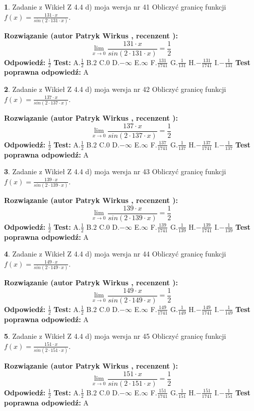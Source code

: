 \documentclass[12pt, a4paper]{article}
\theoremstyle{definition} %
\newtheorem{zad}{}
\newcommand{\zadStart}[1]{\begin{zad}#1\newline}
\newcommand{\zadStop}{\end{zad}}
\newcommand{\rozwStart}[2]{\noindent \textbf{Rozwiązanie (autor #1 , recenzent #2): }\newline}
\newcommand{\rozwStop}{\newline}
\newcommand{\odpStart}{\noindent \textbf{Odpowiedź:}\newline}
\newcommand{\odpStop}{\newline}
\newcommand{\testStart}{\noindent \textbf{Test:}\newline}
\newcommand{\testStop}{\newline}
\newcommand{\kluczStart}{\noindent \textbf{Test poprawna odpowiedź:}\newline}
\newcommand{\kluczStop}{\newline}
\begin{document}
\zadStart{Zadanie z Wikieł Z 4.4 d) moja wersja nr 41}
Obliczyć granicę funkcji $f(x)=\frac{131\cdot x}{sin(2 \cdot131\cdot x)}$.
\zadStop
\rozwStart{Patryk Wirkus}{}
$$\lim\limits_{x\to 0}\frac{131\cdot x}{sin(2 \cdot131\cdot x)}=\frac{1}{2}$$
\rozwStop
\odpStart
$\frac{1}{2}$
\odpStop
\testStart
A.$\frac{1}{2}$
B.$2$
C.$0$
D.$-\infty$
E.$\infty$
F.$\frac{131}{1741}$
G.$\frac{1}{131}$
H.$-\frac{131}{1741}$
I.$-\frac{1}{131}$
\testStop
\kluczStart
A
\kluczStop



\zadStart{Zadanie z Wikieł Z 4.4 d) moja wersja nr 42}
Obliczyć granicę funkcji $f(x)=\frac{137\cdot x}{sin(2 \cdot137\cdot x)}$.
\zadStop
\rozwStart{Patryk Wirkus}{}
$$\lim\limits_{x\to 0}\frac{137\cdot x}{sin(2 \cdot137\cdot x)}=\frac{1}{2}$$
\rozwStop
\odpStart
$\frac{1}{2}$
\odpStop
\testStart
A.$\frac{1}{2}$
B.$2$
C.$0$
D.$-\infty$
E.$\infty$
F.$\frac{137}{1741}$
G.$\frac{1}{137}$
H.$-\frac{137}{1741}$
I.$-\frac{1}{137}$
\testStop
\kluczStart
A
\kluczStop



\zadStart{Zadanie z Wikieł Z 4.4 d) moja wersja nr 43}
Obliczyć granicę funkcji $f(x)=\frac{139\cdot x}{sin(2 \cdot139\cdot x)}$.
\zadStop
\rozwStart{Patryk Wirkus}{}
$$\lim\limits_{x\to 0}\frac{139\cdot x}{sin(2 \cdot139\cdot x)}=\frac{1}{2}$$
\rozwStop
\odpStart
$\frac{1}{2}$
\odpStop
\testStart
A.$\frac{1}{2}$
B.$2$
C.$0$
D.$-\infty$
E.$\infty$
F.$\frac{139}{1741}$
G.$\frac{1}{139}$
H.$-\frac{139}{1741}$
I.$-\frac{1}{139}$
\testStop
\kluczStart
A
\kluczStop



\zadStart{Zadanie z Wikieł Z 4.4 d) moja wersja nr 44}
Obliczyć granicę funkcji $f(x)=\frac{149\cdot x}{sin(2 \cdot149\cdot x)}$.
\zadStop
\rozwStart{Patryk Wirkus}{}
$$\lim\limits_{x\to 0}\frac{149\cdot x}{sin(2 \cdot149\cdot x)}=\frac{1}{2}$$
\rozwStop
\odpStart
$\frac{1}{2}$
\odpStop
\testStart
A.$\frac{1}{2}$
B.$2$
C.$0$
D.$-\infty$
E.$\infty$
F.$\frac{149}{1741}$
G.$\frac{1}{149}$
H.$-\frac{149}{1741}$
I.$-\frac{1}{149}$
\testStop
\kluczStart
A
\kluczStop



\zadStart{Zadanie z Wikieł Z 4.4 d) moja wersja nr 45}
Obliczyć granicę funkcji $f(x)=\frac{151\cdot x}{sin(2 \cdot151\cdot x)}$.
\zadStop
\rozwStart{Patryk Wirkus}{}
$$\lim\limits_{x\to 0}\frac{151\cdot x}{sin(2 \cdot151\cdot x)}=\frac{1}{2}$$
\rozwStop
\odpStart
$\frac{1}{2}$
\odpStop
\testStart
A.$\frac{1}{2}$
B.$2$
C.$0$
D.$-\infty$
E.$\infty$
F.$\frac{151}{1741}$
G.$\frac{1}{151}$
H.$-\frac{151}{1741}$
I.$-\frac{1}{151}$
\testStop
\kluczStart
A
\kluczStop
\end{document}
